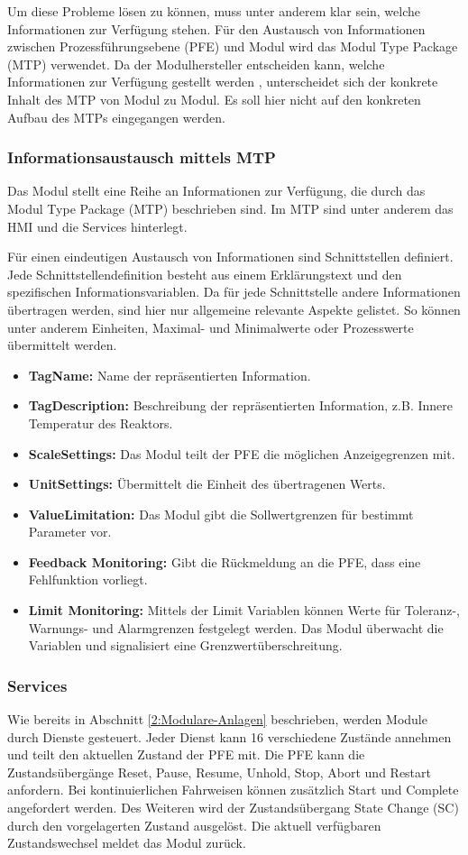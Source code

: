 Um diese Probleme lösen zu können, muss unter anderem klar sein, welche Informationen zur Verfügung stehen. Für den Austausch von Informationen zwischen Prozessführungsebene (PFE) und Modul wird das Modul Type Package (MTP) verwendet. Da der Modulhersteller entscheiden kann, welche Informationen zur Verfügung gestellt werden , unterscheidet sich der konkrete Inhalt des MTP von Modul zu Modul. Es soll hier nicht auf den konkreten Aufbau des MTPs eingegangen werden.

\subsubsection*{Informationsaustausch mittels MTP}
Das Modul stellt eine Reihe an Informationen zur Verfügung, die durch das Modul Type Package (MTP) beschrieben sind. Im MTP sind unter anderem das HMI und die Services hinterlegt. \cite{VDI2658-Blatt1}

Für einen eindeutigen Austausch von Informationen sind Schnittstellen definiert. Jede Schnittstellendefinition besteht aus einem Erklärungstext und den spezifischen Informationsvariablen. Da für jede Schnittstelle andere Informationen übertragen werden, sind hier nur allgemeine relevante Aspekte gelistet. So können unter anderem Einheiten, Maximal- und Minimalwerte oder Prozesswerte übermittelt werden. \cite{VDI2658-Blatt3}
\begin{itemize}
\item \textbf{TagName:} Name der repräsentierten Information. 
\item \textbf{TagDescription:} Beschreibung der repräsentierten Information, z.B. Innere Temperatur des Reaktors.
\item \textbf{ScaleSettings:} Das Modul teilt der PFE die möglichen Anzeigegrenzen mit.
\item \textbf{UnitSettings:} Übermittelt die Einheit des übertragenen Werts.
\item \textbf{ValueLimitation:} Das Modul gibt die Sollwertgrenzen für bestimmt Parameter vor.
\item \textbf{Feedback Monitoring:} Gibt die Rückmeldung an die PFE, dass eine Fehlfunktion vorliegt.
\item \textbf{Limit Monitoring:} Mittels der Limit Variablen können Werte für Toleranz-, Warnungs- und Alarmgrenzen festgelegt werden. Das Modul überwacht die Variablen und signalisiert eine Grenzwertüberschreitung.
\end{itemize}

\subsubsection*{Services}
Wie bereits in Abschnitt \ref{2:Modulare-Anlagen} beschrieben, werden Module durch Dienste gesteuert. Jeder Dienst kann 16 verschiedene Zustände annehmen und teilt den aktuellen Zustand der PFE mit. Die PFE kann die Zustandsübergänge Reset, Pause, Resume, Unhold, Stop, Abort und Restart anfordern. Bei kontinuierlichen Fahrweisen können zusätzlich Start und Complete angefordert werden. Des Weiteren wird der Zustandsübergang State Change (SC) durch den vorgelagerten Zustand ausgelöst. Die aktuell verfügbaren Zustandswechsel meldet das Modul zurück.

